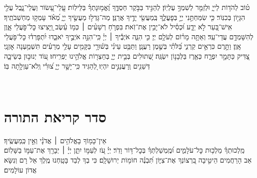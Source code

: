 \documentclass[twoside, openany, parskip=half, 11pt]{book}
\begin{document}
ט֗וֹב לְהֹד֥וֹת לַייָ֑ וּלְזַמֵּ֖ר לְשִׁמְךָ֣ עֶלְיֽוֹן׃
לְהַגִּ֣יד בַּבֹּ֣קֶר חַסְדֶּ֑ךָ וֶ֝אֱמ֥וּנָתְךָ֗ בַּלֵּילֽוֹת׃
עֲֽלֵי־עָ֭שׂוֹר וַעֲלֵי־נָ֑בֶל עֲלֵ֖י הִגָּי֣וֹן בְּכִנּֽוֹר׃
כִּ֤י שִׂמַּחְתַּ֣נִי יְיָ֣ בְּפׇעֳלֶ֑ךָ בְּֽמַעֲשֵׂ֖י יָדֶ֣יךָ אֲרַנֵּֽן׃
מַה־גָּדְל֣וּ מַעֲשֶׂ֣יךָ יְיָ֑ מְ֝אֹ֗ד עָמְק֥וּ מַחְשְׁבֹתֶֽיךָ׃
אִֽישׁ־בַּ֭עַר לֹ֣א יֵדָ֑ע וּ֝כְסִ֗יל לֹא־יָבִ֥ין אֶת־זֹֽאת׃
בִּפְרֹ֤חַ רְשָׁעִ֨ים ׀ כְּמ֥וֹ עֵ֗שֶׂב וַ֭יָּצִיצוּ כׇּל־פֹּ֣עֲלֵי אָ֑וֶן לְהִשָּׁמְדָ֥ם עֲדֵי־עַֽד׃
וְאַתָּ֥ה מָר֗וֹם לְעֹלָ֥ם יְיָ׃
כִּ֤י הִנֵּ֢ה אֹיְבֶ֡יךָ ׀ יְיָ֗ כִּֽי־הִנֵּ֣ה אֹיְבֶ֣יךָ יֹאבֵ֑דוּ יִ֝תְפָּרְד֗וּ כׇּל־פֹּ֥עֲלֵי אָֽוֶן׃
וַתָּ֣רֶם כִּרְאֵ֣ים קַרְנִ֑י בַּ֝לֹּתִ֗י בְּשֶׁ֣מֶן רַעֲנָֽן׃
וַתַּבֵּ֥ט עֵינִ֗י בְּשׁ֫וּרָ֥י בַּקָּמִ֖ים עָלַ֥י מְרֵעִ֗ים תִּשְׁמַ֥עְנָה אׇזְנָֽי׃
צַ֭דִּיק כַּתָּמָ֣ר יִפְרָ֑ח כְּאֶ֖רֶז בַּלְּבָנ֣וֹן יִשְׂגֶּֽה׃
שְׁ֭תוּלִים בְּבֵ֣ית יְיָ֑ בְּחַצְר֖וֹת אֱלֹהֵ֣ינוּ יַפְרִֽיחוּ׃
ע֭וֹד יְנוּב֣וּן בְּשֵׂיבָ֑ה דְּשֵׁנִ֖ים וְֽרַעֲנַנִּ֣ים יִהְיֽוּ׃
לְ֭הַגִּיד כִּֽי־יָשָׁ֣ר יְיָ֑ צ֝וּרִ֗י וְֽלֹא־עַוְלָ֥תָה בּֽוֹ׃\\

\RChBarekhi


\ledavid\\
\mournerskaddish


\chapter[סדר קריאת התורה]{ סדר קריאת התורה }

אֵין־כָּמ֖וֹךָ בָאֱלֹהִ֥ים ׀ אֲדֹנָ֗י וְאֵ֣ין כְּֽמַעֲשֶֽׂיךָ׃\\
מַֽלְכוּתְךָ֗ מַלְכ֥וּת כׇּל־עֹלָמִ֑ים וּ֝מֶֽמְשַׁלְתְּךָ֗ בְּכׇל־דּ֥וֹר וָדֹֽר׃
\melekhmalakhyimlokh
יְיָ֗ עֹ֭ז לְעַמּ֣וֹ יִתֵּ֑ן יְיָ֓ ׀ יְבָרֵ֖ךְ אֶת־עַמּ֣וֹ בַשָּׁלֽוֹם׃\\
אַב הָרַחֲמִים
%
הֵיטִ֣יבָה בִ֭רְצוֹנְךָ אֶת־צִיּ֑וֹן תִּ֝בְנֶ֗ה חוֹמ֥וֹת יְרוּשָׁלָֽ‍ִם׃
כִּי בְךָ לְבַד בָּטָֽחְנוּ מֶֽלֶךְ אֵל רָם וְנִשָּׂא אֲדוֹן עוֹלָמִים׃

\pesicha
\end{document}
